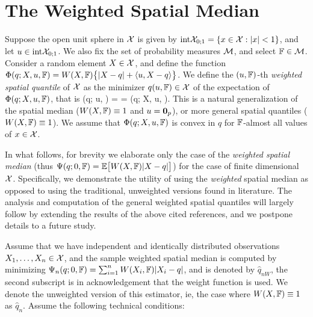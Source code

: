 \section{The Weighted Spatial Median}
\label{Sec:WSQuantiles}

Suppose the open unit sphere in $\mathcal{X}$ is given by 
$\textrm{int} {\mathcal{X}}_{0; 1} = \{ x \in \mathcal{X}: | x | < 1 \}$, and let
 $u \in \textrm{int} {\mathcal{X}}_{0; 1}$. We also fix the set of probability measures $\mathcal{M}$, 
 and select ${\mathbb{F}} \in \mathcal{M}$. Consider a random element $X \in \mathcal{X}$, and define the 
 function $\Phi (q; X, u, {\mathbb{F}}) = W (X, {\mathbb{F}}) \bigl\{ | X - q | 
+ \langle u, X - q \rangle \bigr\}$. 
We define the $(u, {\mathbb{F}})$-th \textit{weighted spatial quantile} of $\mathcal{X}$ 
as the minimizer $q (u, {\mathbb{F}}) \in \mathcal{X}$ of the expectation of $\Phi (q; X, u, {\mathbb{F}})$, 
that is
\baq
\Psi (q; u, \BF) = \BE {} = \BE \Phi (q; X, u, \BF).
\label{eq:WeightedQuantile}
\eaq
%
\noindent
This is a natural generalization of the spatial median \citep{ref:JASA96862_Chaudhuri, ref:Biometrika48414_Haldane,ref:AoS97435_Koltchinskii} ($W(X, {\mathbb{F}}) \equiv 1$ and $u = {\bf 0}_p$), or more general spatial quantiles \citep{ref:AoS17591_Cardotetal_Median_HilbertSpace, ref:AoS141203_ChakrabortyChaudhuri_Banach_Quantile, ref:Bernoulli152308_Minsker_Median_Banach} ($W(X, {\mathbb{F}}) \equiv 1$). We assume that 
$\Phi (q; X, u, {\mathbb{F}})$ is convex in $q$ for ${\mathbb{F}}$-almost all values of $x \in \mathcal{X}$. 
 

In what follows, for brevity we elaborate only the case of the \textit{weighted spatial median} (thus $\Psi (q; 0, {\mathbb{F}}) = {\mathbb{E}} \bigl[ W (X, {\mathbb{F}}) | X - q | \bigr] $) for the case of finite dimensional $\mathcal{X}$. Specifically, we demonstrate the utility of using the {\it weighted} spatial median as opposed to using the traditional, unweighted versions found in literature. The analysis and computation of the general weighted spatial quantiles will largely follow by extending the results of the above cited references, and we postpone details to a future study.

Assume that we have independent and identically distributed observations $X_{1}, \ldots, X_{n} \in \mathcal{X}$, and the sample weighted spatial median is computed by minimizing $\Psi_{n} (q; 0, {\mathbb{F}}) = \sum_{i = 1}^{n} W (X_{i}, {\mathbb{F}}) | X_{i} - q | $, and is denoted by $\hat{q}_{nW}$, the second subscript is in acknowledgement that the weight function is used. We denote the unweighted version of this estimator, ie, the case where $W (X, {\mathbb{F}}) \equiv 1$ as $\hat{q}_{n}$. Assume the following technical conditions:

